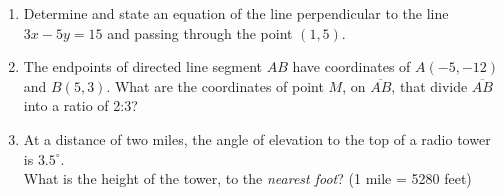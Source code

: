 \documentclass[12pt, oneside]{article}
\begin{document}
\begin{enumerate}[itemsep=2cm]
\item Determine and state an equation of the line perpendicular to the line\\ $3x-5y=15$ and passing through the point $(1,5)$.
  
\item The endpoints of directed line segment $AB$ have coordinates of
$A(-5,-12)$ and $B(5,3)$. What are the coordinates of point $M$, on $\overline{AB}$, that divide $\overline{AB}$ into a ratio of 2:3?

\item At a distance of two miles, the angle of elevation to the top of a radio tower is $3.5^\circ$. \\[0.25cm]
What is the height of the tower, to the \emph{nearest foot}? (1 mile = 5280 feet)
  \begin{center}
  \end{center}

\end{enumerate}
\end{document}
